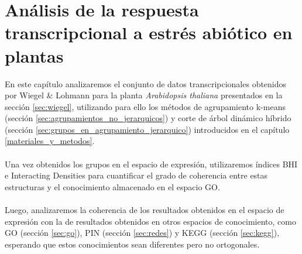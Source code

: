 \chapter{Análisis de la respuesta transcripcional a estrés abiótico en plantas}
En este capítulo analizaremos el conjunto de datos transcripcionales obtenidos por Wiegel \& Lohmann para la planta \textit{Arabidopsis thaliana} presentados en la sección \ref{sec:wiegel}, utilizando para ello los métodos de agrupamiento k-means (sección \ref{sec:agrupamientos_no_jerarquicos}) y corte de árbol dinámico híbrido (sección \ref{sec:grupos_en_agrupamiento_jerarquico}) introducidos en el capítulo \ref{materiales_y_metodos}.\\\\
Una vez obtenidos los grupos en el espacio de expresión, utilizaremos índices BHI e Interacting Densities para cuantificar el grado de coherencia entre estas estructuras y el conocimiento almacenado en el espacio GO.\\\\
Luego, analizaremos la coherencia de los resultados obtenidos en el espacio de expresión con la de resultados obtenidos en otros espacios de conocimiento, como GO (sección \ref{sec:go}), PIN  (sección \ref{sec:redes}) y KEGG (sección \ref{sec:kegg}), esperando que estos conocimientos sean diferentes pero no ortogonales. 

